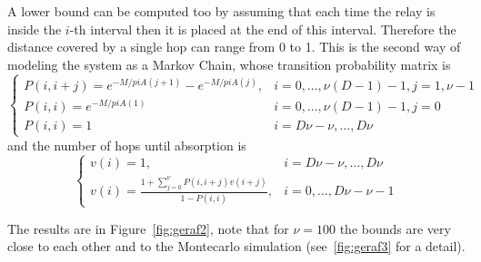 \documentclass[10pt]{article}
\begin{document}
A lower bound can be computed too by assuming that each time the relay is inside the $i$-th interval then it is placed at the end of this interval. Therefore the distance covered by a single hop can range from 0 to 1. This is the second way of modeling the system as a Markov Chain, whose transition probability matrix is
\begin{equation}
\begin{cases}
  P(i, i + j) = e^{-M/pi A(j+1)} - e^{-M/pi A(j)}, & i = 0, \dots, \nu (D - 1) - 1, j = 1, \nu-1 \\
  P(i, i) = e^{-M/pi A(1)} & i = 0, \dots, \nu (D - 1) - 1, j = 0 \\
  P(i, i) = 1 & i = D\nu - \nu, \dots, D\nu 
\end{cases}
\end{equation}
and the number of hops until absorption is
\begin{equation}
\begin{cases}
  v(i) = 1, & i = D\nu - \nu , \dots, D\nu  \\
  v(i) = \frac{1+\sum_{j = 0}^{\nu} P(i, i + j) v(i + j)}{1-P(i, i)}, & i = 0, \dots, D\nu - \nu - 1
\end{cases}
\end{equation}

The results are in Figure~\ref{fig:geraf2}, note that for $\nu = 100$ the bounds are very close to each other and to the Montecarlo simulation (see~\ref{fig:geraf3} for a detail).
\end{document}
